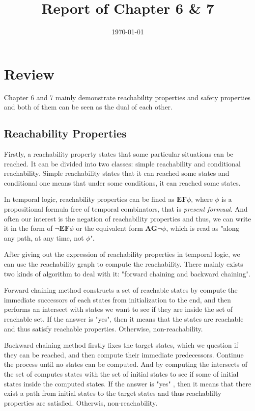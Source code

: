 \documentclass[10pt, conference]{IEEEtran}
\begin{document}
    \title{Report of Chapter 6 \& 7}
    \author{}
    \date{\today}
    \maketitle

    \section{Review}
        Chapter 6 and 7 mainly demonstrate reachability properties and safety properties and both of them can be seen as the dual of each other.
        
        \subsection{Reachability Properties}
        Firstly, a reachability property states that some particular situations can be reached. It can be divided into two classes: simple reachability and conditional reachability. Simple reachability states that it can reached some states and conditional one means that under some conditions, it can reached some states.
        
        In temporal logic, reachability properties can be fined as $\textbf{EF}\phi$, where $\phi$ is a propositional formula free of temporal combinators, that is {\itshape present formual}. And often our interest is the negation of reachability properties and thus, we can write it in the form of $\neg\textbf{EF}\phi$ or the equivalent form $\textbf{AG}\neg\phi$, which is read as "along any path, at any time, not $\phi$".
        
        After giving out the expression of reachability properties in temporal logic, we can use the reachability graph to compute the reachability. There mainly exists two kinds of algorithm to deal with it: "forward chaining and backward chaining".
        
        Forward chaining method constructs a set of reachable states by compute the immediate successors of each states from initialization to the end, and then performs an intersect with states we want to see if they are inside the set of reachable set. If the answer is "yes", then it means that the states are reachable and thus satisfy reachable properties. Otherwise, non-reachability.
        
        Backward chaining method firstly fixes the target states, which we question if they can be reached, and then compute their immediate predecessors. Continue the process until no states can be computed. And by computing the intersects of the set of computes states with the set of initial states to see if some of initial states inside the computed states. If the answer is "yes" , then it means that there exist a path from initial states to the target states and thus reachablilty properties are satisfied. Otherwis, non-reachability.
        
\end{document}
